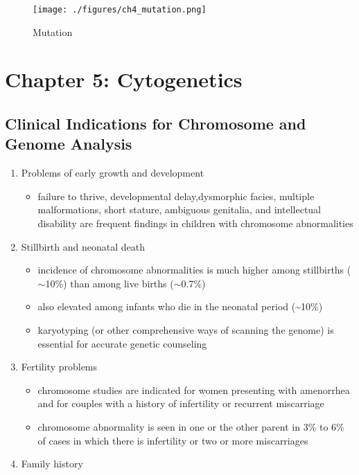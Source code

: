 \documentclass{scrartcl}
\begin{document}
\begin{figure}[htbp]
\centering
\texttt{[image: ./figures/ch4\_mutation.png]}
\caption{\label{fig:orgd299b12}
Mutation}
\end{figure}

\section{Chapter 5: Cytogenetics}
\label{sec:orgb5b6eb5}
\subsection{Clinical Indications for Chromosome and Genome Analysis}
\label{sec:org400300d}
\begin{enumerate}
\item Problems of early growth and development
\label{sec:org585d3b9}
\begin{itemize}
\item failure to thrive, developmental delay,dysmorphic facies, multiple
malformations, short stature, ambiguous genitalia, and
intellectual disability are frequent findings in children with
chromosome abnormalities
\end{itemize}
\item Stillbirth and neonatal death
\label{sec:orgf6a73a3}
\begin{itemize}
\item incidence of chromosome abnormalities is much higher among
stillbirths (\(\sim\)10\%) than among live births (\(\sim\)0.7\%)
\item also elevated among infants who die in the neonatal period (\textasciitilde{}10\%)
\item karyotyping (or other comprehensive ways of scanning the genome) is
essential for accurate genetic counseling
\end{itemize}
\item Fertility problems
\label{sec:org482929d}
\begin{itemize}
\item chromosome studies are indicated for women presenting with
amenorrhea and for couples with a history of infertility or recurrent miscarriage
\item chromosome abnormality is seen in one or the other parent in 3\% to
6\% of cases in which there is infertility or two or more
miscarriages
\end{itemize}
\item Family history
\label{sec:org9eb7ac5}
\begin{itemize}

\end{itemize}
\end{enumerate}
\end{document}
